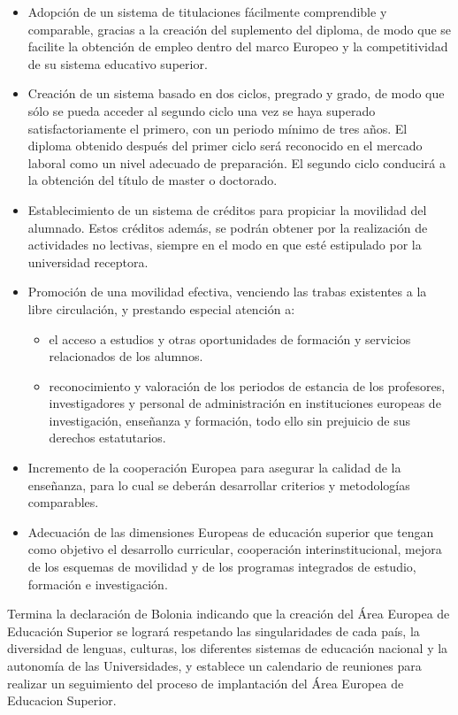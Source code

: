 		\begin{itemize}
			\item Adopción de un sistema de titulaciones fácilmente comprendible y comparable, gracias a la creación del suplemento del diploma, de modo que se facilite la obtención de empleo dentro del marco Europeo y la competitividad de su sistema educativo superior.
			\item Creación de un sistema basado en dos ciclos, pregrado y grado, de modo que sólo se pueda acceder al segundo ciclo una vez se haya superado satisfactoriamente el primero, con un periodo mínimo de tres años. El diploma obtenido después del primer ciclo será reconocido en el mercado laboral como un nivel adecuado de preparación. El segundo ciclo conducirá a la obtención del título de master o doctorado. 
			\item Establecimiento de un sistema de créditos para propiciar la movilidad del alumnado. Estos créditos además, se podrán obtener por la realización de actividades no lectivas, siempre en el modo en que esté estipulado por la universidad receptora.
			\item Promoción de una movilidad efectiva, venciendo las trabas existentes a la libre circulación, y prestando especial atención a:
			\begin{itemize}
				\item el acceso a estudios y otras oportunidades de formación y servicios relacionados de los alumnos.
				\item reconocimiento y valoración de los periodos de estancia de los profesores, investigadores y personal de administración en instituciones europeas de investigación, enseñanza y formación, todo ello sin prejuicio de sus derechos estatutarios.
			\end{itemize}
			\item Incremento de la cooperación Europea para asegurar la calidad de la enseñanza, para lo cual se deberán desarrollar criterios y metodologías comparables.
			\item Adecuación de las dimensiones Europeas de educación superior que tengan como objetivo el desarrollo curricular, cooperación interinstitucional, mejora de los esquemas de movilidad y de los programas integrados de estudio, formación e investigación.
		\end{itemize}

		Termina la declaración de Bolonia indicando que la creación del Área Europea de Educación Superior se logrará respetando las singularidades de cada país, la diversidad de lenguas, culturas, los diferentes sistemas de educación nacional y la autonomía de las Universidades, y establece un calendario de reuniones para realizar un seguimiento del proceso de implantación del Área Europea de Educacion Superior. 

